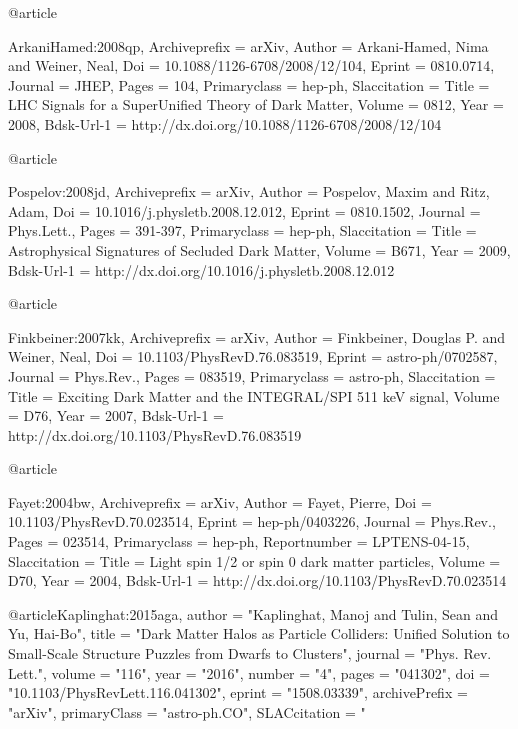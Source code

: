{{{{{{@article{ArkaniHamed:2008qp,
	Archiveprefix = {arXiv},
	Author = {Arkani-Hamed, Nima and Weiner, Neal},
	Doi = {10.1088/1126-6708/2008/12/104},
	Eprint = {0810.0714},
	Journal = {JHEP},
	Pages = {104},
	Primaryclass = {hep-ph},
	Slaccitation = {%
	Title = {{LHC Signals for a SuperUnified Theory of Dark Matter}},
	Volume = {0812},
	Year = {2008},
	Bdsk-Url-1 = {http://dx.doi.org/10.1088/1126-6708/2008/12/104}
}

@article{Pospelov:2008jd,
	Archiveprefix = {arXiv},
	Author = {Pospelov, Maxim and Ritz, Adam},
	Doi = {10.1016/j.physletb.2008.12.012},
	Eprint = {0810.1502},
	Journal = {Phys.Lett.},
	Pages = {391-397},
	Primaryclass = {hep-ph},
	Slaccitation = {%
	Title = {{Astrophysical Signatures of Secluded Dark Matter}},
	Volume = {B671},
	Year = {2009},
	Bdsk-Url-1 = {http://dx.doi.org/10.1016/j.physletb.2008.12.012}
}

@article{Finkbeiner:2007kk,
	Archiveprefix = {arXiv},
	Author = {Finkbeiner, Douglas P. and Weiner, Neal},
	Doi = {10.1103/PhysRevD.76.083519},
	Eprint = {astro-ph/0702587},
	Journal = {Phys.Rev.},
	Pages = {083519},
	Primaryclass = {astro-ph},
	Slaccitation = {%
	Title = {{Exciting Dark Matter and the INTEGRAL/SPI 511 keV signal}},
	Volume = {D76},
	Year = {2007},
	Bdsk-Url-1 = {http://dx.doi.org/10.1103/PhysRevD.76.083519}
}

@article{Fayet:2004bw,
	Archiveprefix = {arXiv},
	Author = {Fayet, Pierre},
	Doi = {10.1103/PhysRevD.70.023514},
	Eprint = {hep-ph/0403226},
	Journal = {Phys.Rev.},
	Pages = {023514},
	Primaryclass = {hep-ph},
	Reportnumber = {LPTENS-04-15},
	Slaccitation = {%
	Title = {{Light spin 1/2 or spin 0 dark matter particles}},
	Volume = {D70},
	Year = {2004},
	Bdsk-Url-1 = {http://dx.doi.org/10.1103/PhysRevD.70.023514}
}


@article{Kaplinghat:2015aga,
      author         = "Kaplinghat, Manoj and Tulin, Sean and Yu, Hai-Bo",
      title          = "{Dark Matter Halos as Particle Colliders: Unified
                        Solution to Small-Scale Structure Puzzles from Dwarfs to
                        Clusters}",
      journal        = "Phys. Rev. Lett.",
      volume         = "116",
      year           = "2016",
      number         = "4",
      pages          = "041302",
      doi            = "10.1103/PhysRevLett.116.041302",
      eprint         = "1508.03339",
      archivePrefix  = "arXiv",
      primaryClass   = "astro-ph.CO",
      SLACcitation   = "%
}

}}}}}}}}}}
